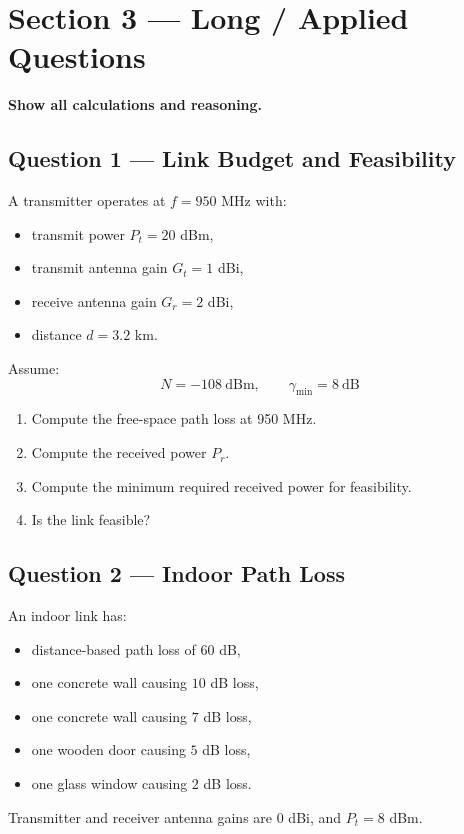 \documentclass[11pt,a4paper]{article}
\begin{document}
\newpage
\section*{Section 3 --- Long / Applied Questions}
\textbf{Show all calculations and reasoning.}

\subsection*{Question 1 --- Link Budget and Feasibility}
A transmitter operates at $f = 950$ MHz with:
\begin{itemize}[leftmargin=1.2cm]
    \item transmit power $P_t = 20$ dBm,
    \item transmit antenna gain $G_t = 1$ dBi,
    \item receive antenna gain $G_r = 2$ dBi,
    \item distance $d = 3.2$ km.
\end{itemize}

Assume:
\[
N = -108\ \mathrm{dBm}, \qquad \gamma_{\min} = 8\ \mathrm{dB}
\]

\begin{enumerate}[label=\alph*)]
    \item Compute the free-space path loss at 950 MHz.
    \item Compute the received power $P_r$.
    \item Compute the minimum required received power for feasibility.
    \item Is the link feasible?
\end{enumerate}

\subsection*{Question 2 --- Indoor Path Loss}
An indoor link has:
\begin{itemize}[leftmargin=1.2cm]
    \item distance-based path loss of $60$ dB,
    \item one concrete wall causing $10$ dB loss,
    \item one concrete wall causing $7$ dB loss,
    \item one wooden door causing $5$ dB loss,
    \item one glass window causing $2$ dB loss.
\end{itemize}

Transmitter and receiver antenna gains are $0$ dBi, and $P_t = 8$ dBm.
\end{document}
